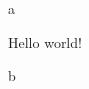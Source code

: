 \documentclass{article}
\begin{document}
  a
  \begin{texvoiceListing}
   Hello world!
  \end{texvoiceListing}
  b
\end{document}
